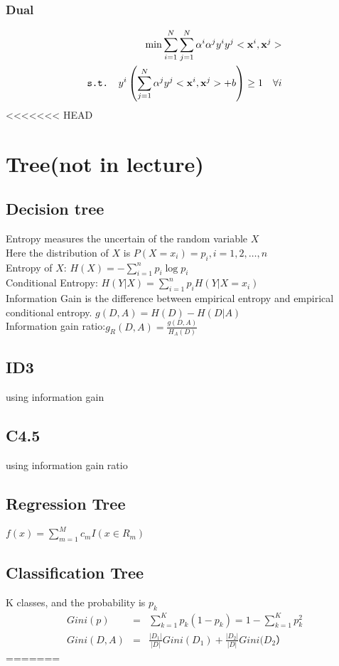 \documentclass[12pt,a4paper]{article}
\begin{document}
\subsubsection*{Dual}
\begin{eqnarray*}
\min \sum_{i=1}^{N}\sum_{j=1}^{N}\alpha^i\alpha^jy^iy^j<{\bf x}^i,{\bf x}^j> \\
\texttt{s.t. } y^i\left(\sum_{j=1}^{N}\alpha^jy^j<{\bf x}^i,{\bf x}^j>+b \right)\ge 1  \quad  \forall i
\end{eqnarray*}
<<<<<<< HEAD
\section*{Tree(not in lecture)}
\subsection*{Decision tree}
Entropy measures the uncertain of the random variable $X$\\
Here the distribution of $X$ is $P(X=x_i)=p_i, i=1,2,\ldots,n$ \\
Entropy of $X$: $H(X) = -\sum_{i=1}^{n}p_i\log p_i$ \\
Conditional Entropy: $H(Y|X)=\sum_{i=1}^{n}p_iH(Y|X=x_i)$ \\
Information Gain is the difference between empirical entropy and empirical conditional entropy.
$g(D,A) = H(D)-H(D|A)$\\
Information gain ratio:$g_R(D,A)=\frac{g(D,A)}{H_A(D)}$
\subsection*{ID3}
using information gain
\subsection*{C4.5}
using information gain ratio
\subsection*{Regression Tree}
$f(x)=\sum_{m=1}^{M}c_mI(x\in R_m)$
\subsection*{Classification Tree}
K classes, and the probability is $p_k$\\
\begin{eqnarray*}
Gini(p) &=& \sum_{k=1}^{K}p_k(1-p_k)=1-\sum_{k=1}^{K}p_k^2\\
Gini(D,A) &=& \frac{|D_1|}{|D|}Gini(D_1)+\frac{|D_2|}{|D|}Gini(D_2）
\end{eqnarray*}
=======
\end{document}
